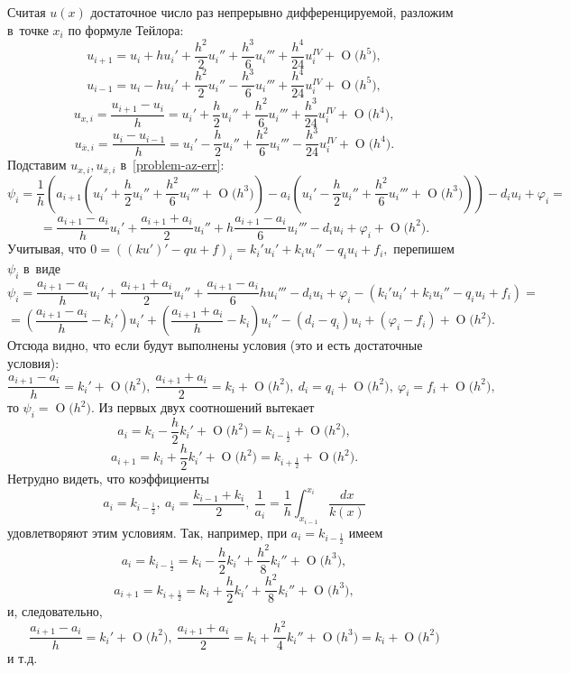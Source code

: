 \documentclass[11pt,a4paper,twoside]{report}
\numberwithin{equation}{section}
\theoremstyle{definition}
\theoremstyle{plain}
\newcommand{\bigO}[1]{\ensuremath{\operatorname{O}\bigl(#1\bigr)}}
\begin{document}
Считая $u(x)$ достаточное число раз непрерывно дифференцируемой, разложим в~точке
$x_i$ по формуле Тейлора:
%
$$
    u_{i+1}=u_i+hu_i'+\frac{h^2}{2}u_i''+\frac{h^3}{6}u_i'''
    +\frac{h^4}{24}u_i^{IV}+\bigO{h^5},
$$
%
%
$$
    u_{i-1}=u_i-hu_i'+\frac{h^2}{2}u_i''-\frac{h^3}{6}u_i'''
    +\frac{h^4}{24}u_i^{IV}+\bigO{h^5},
$$
%
%
$$
    u_{x,i}=\frac{u_{i+1}-u_i}{h}=u_i'+\frac{h}{2}u_i''+\frac{h^2}{6}u_i'''+
    \frac{h^3}{24}u_i^{IV}+\bigO{h^4},
$$
%
%
$$
    u_{\overline{x},i}=\frac{u_{i}-u_{i-1}}{h}=u_i'-\frac{h}{2}u_i''+\frac{h^2}{6}u_i'''-
    \frac{h^3}{24}u_i^{IV}+\bigO{h^4}.
$$
%
Подставим $u_{x,i},u_{\overline{x},i}$ в~\eqref{problem-az-err}:
%
$$
    \psi_i=\frac{1}{h}\left(a_{i+1}\left(u_i'+\frac{h}{2}u_i''
    +\frac{h^2}{6}u_i'''+\bigO{h^3}\right)-a_i\left(u_i'-\frac{h}{2}u_i''
    +\frac{h^2}{6}u_i'''+\bigO{h^3}\right)\right) - d_iu_i + \varphi_i=
$$
%
%
$$
    =\frac{a_{i+1}-a_i}{h}u_i'+\frac{a_{i+1}+a_i}{2}u_i''+h\frac{a_{i+1}-a_i}{6}u_i'''
    -d_iu_i + \varphi_i +\bigO{h^2}.
$$
%
Учитывая, что
%
$
    0 = \left((ku')'-qu+f\right)_i=k_i'u_i'+k_iu_i''-q_iu_i+f_i,
$
%
перепишем $\psi_i$ в~виде
%
$$
    \psi_i=\frac{a_{i+1}-a_i}{h}u_i'+\frac{a_{i+1}+a_i}{2}u_i''
    +\frac{a_{i+1}-a_i}{6}hu_i'''-d_iu_i+\varphi_i-\left(k_i'u_i'
    +k_iu_i''-q_iu_i+f_i\right)=
$$
%
%
$$
    =\left(\frac{a_{i+1}-a_i}{h}-k_i'\right)u_i'
    +\left(\frac{a_{i+1}+a_i}{h}-k_i\right)u_i''
    -(d_i-q_i)u_i+(\varphi_i-f_i)+\bigO{h^2}.
$$
%
Отсюда видно, что если будут выполнены условия (это и есть достаточные условия):
%
\begin{equation}
    \label{condition-az-err}
    \frac{a_{i+1}-a_i}{h}=k_i'+\bigO{h^2},~\frac{a_{i+1}+a_i}{2}=k_i+\bigO{h^2},
    ~d_i=q_i+\bigO{h^2},~\varphi_i=f_i+\bigO{h^2},
\end{equation}
%
то $\psi_i=\bigO{h^2}$.
Из первых двух соотношений вытекает
%
$$
    a_i=k_i-\frac{h}{2}k_i'+\bigO{h^2}=k_{i-\frac 12}+\bigO{h^2},
$$
%
%
$$
    a_{i+1}=k_i+\frac{h}{2}k_i'+\bigO{h^2}=k_{i+\frac 12}+\bigO{h^2}.
$$
%
Нетрудно видеть, что коэффициенты
%
$$
    a_i=k_{i-\frac 12},~a_i=\frac{k_{i-1}+k_i}{2},~\frac{1}{a_i}=\frac{1}{h}
    \int_{x_{i-1}}^{x_i}\frac{dx}{k(x)}
$$
%
удовлетворяют этим условиям. Так, например, при $a_i=k_{i-\frac 12}$ имеем
%
$$
    a_i=k_{i-\frac 12} = k_i - \frac h2 k_i'+\frac{h^2}{8}k_i''+\bigO{h^3},
$$
%
%
$$
    a_{i+1}=k_{i+\frac 12}=k_i + \frac h2 k_i'+\frac{h^2}{8}k_i''+\bigO{h^3},
$$
%
и, следовательно,
%
$$
    \frac{a_{i+1}-a_i}{h}=k_i'+\bigO{h^2},~\frac{a_{i+1}+a_i}{2}=k_i
    +\frac{h^2}{4}k_i''+\bigO{h^3}=k_i+\bigO{h^2}
$$
%
и т.д.
\end{document}
